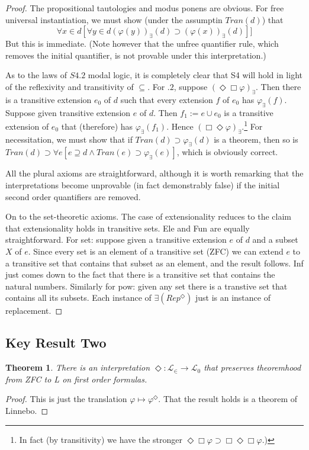 \documentclass{article}
\newtheorem{theorem}{Theorem}
\begin{document}
\begin{proof}
    The propositional tautologies and modus ponens are obvious. For free universal 
    instantiation, we must show (under the assumptin $Tran(d)$) that
    $$\forall x \in d [ \forall y \in d (\varphi(y))_\exists (d) \supset (\varphi(x))_\exists(d)]]$$
    But this is immediate. (Note however that the unfree quantifier rule,
    which removes the initial quantifier, is not provable 
    under this interpretation.)

    As to the laws of $S4.2$ modal logic, it is completely clear that S4 will hold 
    in light of the reflexivity and transitivity of $\subseteq$. For $.2$, suppose 
    $(\Diamond \Box \varphi)_\exists$. Then there is a transitive extension $e_0$ of $d$ 
    such that every extension $f$ of $e_0$ has $\varphi_\exists(f)$. Suppose given 
    transitive extension $e$ of $d$. Then $f_1 := e \cup e_0$ is a transitive extension 
    of $e_0$ that (therefore) has $\varphi_\exists(f_1)$. 
    Hence $(\Box \Diamond \varphi)_\exists$.\footnote{
        In fact (by transitivity) we have the stronger 
        $\Diamond \Box \varphi \supset \Box \Diamond \Box \varphi$.)
    } For necessitation, we must show that if $Tran(d) \supset \varphi_\exists(d)$
    is a theorem, then so is 
    $Tran(d) \supset \forall e [e \supseteq d \wedge Tran(e) \supset \varphi_\exists(e)]$,
    which is obviously correct.

    All the plural axioms are straightforward, although it is worth 
    remarking that the interpretations become unprovable 
    (in fact demonstrably false) if the initial second order 
    quantifiers are removed. 

    On to the set-theoretic axioms. The case of extensionality reduces to the claim 
    that extensionality holds in transitive sets. Ele and Fun are equally straightforward.
    For set: suppose given a transitive extension $e$ of $d$ and a subset $X$ of $e$. Since 
    every set is an element of a transitive set (ZFC) we can extend $e$ to a transitive 
    set that contains that subset as an element, and the result follows. Inf just comes down 
    to the fact that there is a transitive set that contains the natural numbers. 
    Similarly for pow: given any set there is a transtive set that contains all its subsets.
    Each instance of $\exists(Rep^\Diamond)$ just is an instance of replacement.
\end{proof}

\subsection{Key Result Two}
\begin{theorem}
There is an interpretation $\Diamond: \mathcal{L}_\in \to \mathcal{L}_0$ that preserves theoremhood from ZFC to L \emph{on first order formulas}. 
\end{theorem}
\begin{proof}
    This is just the translation $\varphi \mapsto \varphi^\Diamond$. That the result holds 
    is a theorem of Linnebo.
\end{proof}
\end{document}
